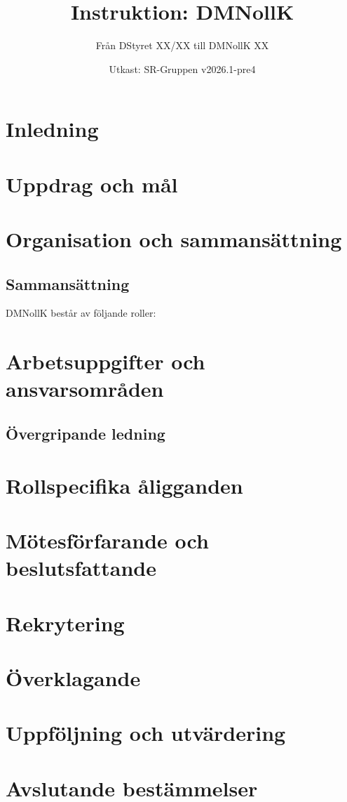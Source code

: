 \documentclass[a4paper]{dtekinstruktion}
\title{Instruktion: DMNollK}
\subtitle{Från DStyret XX/XX till DMNollK XX}
\date{Utkast: SR-Gruppen v2026.1-pre4}
\begin{document}
\makeheadfoot

\setcounter{tocdepth}{2}
\tableofcontents

\section{Inledning}

\section{Uppdrag och mål}

\section{Organisation och sammansättning}
\subsection{Sammansättning}
DMNollK består av följande roller:

\section{Arbetsuppgifter och ansvarsområden}
\subsection{Övergripande ledning}

\section{Rollspecifika åligganden}


\section{Mötesförfarande och beslutsfattande}

\section{Rekrytering}

\section{Överklagande}
\section{Uppföljning och utvärdering}

\section{Avslutande bestämmelser}
\end{document}
